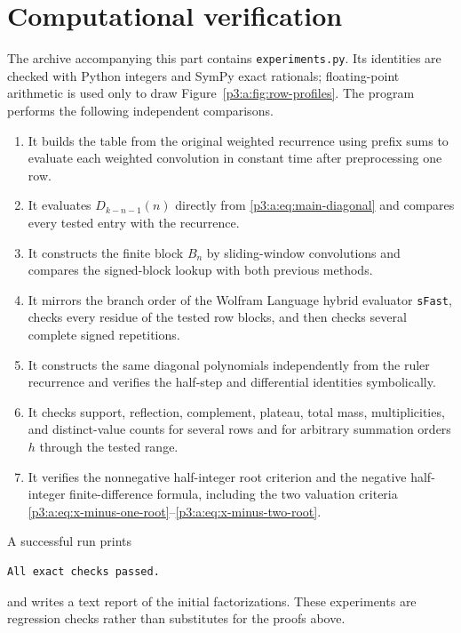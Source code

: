 \documentclass[11pt,oneside]{article}
\numberwithin{equation}{section}
\theoremstyle{definition}
\theoremstyle{remark}
\begin{document}
\section{Computational verification}\label{p3:ch:verification}

The archive accompanying this part contains
\texttt{experiments.py}.  Its identities are checked with Python integers and
SymPy exact rationals; floating-point arithmetic is used only to draw
Figure~\ref{p3:a:fig:row-profiles}.  The program performs the following independent
comparisons.

\begin{enumerate}
\item It builds the table from the original weighted recurrence using prefix
sums to evaluate each weighted convolution in constant time after preprocessing
one row.

\item It evaluates \(D_{k-n-1}(n)\) directly from
\eqref{p3:a:eq:main-diagonal} and compares every tested entry with the recurrence.

\item It constructs the finite block \(B_n\) by sliding-window convolutions
and compares the signed-block lookup with both previous methods.

\item It mirrors the branch order of the Wolfram Language hybrid evaluator
\texttt{sFast}, checks every residue of the tested row blocks, and then checks
several complete signed repetitions.

\item It constructs the same diagonal polynomials independently from the
ruler recurrence and verifies the half-step and differential identities
symbolically.

\item It checks support, reflection, complement, plateau, total mass,
multiplicities, and distinct-value counts for several rows and for arbitrary
summation orders \(h\) through the tested range.

\item It verifies the nonnegative half-integer root criterion and the negative
half-integer finite-difference formula, including the two valuation criteria
\eqref{p3:a:eq:x-minus-one-root}--\eqref{p3:a:eq:x-minus-two-root}.
\end{enumerate}

A successful run prints
\begin{lstlisting}
All exact checks passed.
\end{lstlisting}
and writes a text report of the initial factorizations.  These experiments are
regression checks rather than substitutes for the proofs above.
\end{document}
